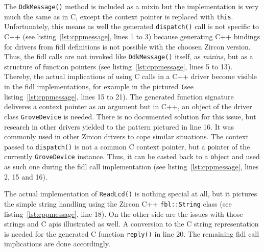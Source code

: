 The \texttt{DdkMessage()} method is included as a mixin but the implementation is very much the same as in C, except the context pointer is replaced with \texttt{this}.
Unfortunately, this means as well the generated \texttt{dispatch()} call is not specific to C++ (see listing~\ref{lst:cppmessage}, lines 1 to 3) because generating C++ bindings for drivers from \ac{fidl} definitions is not possible with the choosen Zircon version.
Thus, the \ac{fidl} calls are not invoked like \texttt{DdkMessage()} itself, as \textit{mixins}, but as a structure of function pointers (see listing~\ref{lst:cppmessage}, lines 5 to 13).
Thereby, the actual implications of using C calls in a C++ driver become visible in the \ac{fidl} implementations, for example in the pictured \texttt (see listing~\ref{lst:cppmessage}, lines 15 to 21).
The generated function signature deliveres a context pointer as an argument but in C++, an object of the driver class \texttt{GroveDevice} is needed.
There is no documented solution for this issue, but research in other drivers yielded to the pattern pictured in line 16.
It was commonly used in other Zircon drivers to cope similar situations.
The context passed to \texttt{dispatch()} is not a common C context pointer, but a \texttt pointer of the currently \texttt{GroveDevice} instance.
Thus, it can be casted back to a \texttt object and used as such one during the \ac{fidl} call implementation (see listing~\ref{lst:cppmessage}, lines 2, 15 and 16).

The actual implementation of \texttt{ReadLcd()} is nothing special at all, but it pictures the simple string handling using the Zircon C++ \texttt{fbl::String} class (see listing~\ref{lst:cppmessage}, line 18).
On the other side are the issues with those strings and C \acp{api} illustrated as well.
A conversion to the C string representation is needed for the generated C function \texttt{reply()} in line 20.
The remaining \ac{fidl} call implications are done accordingly.

